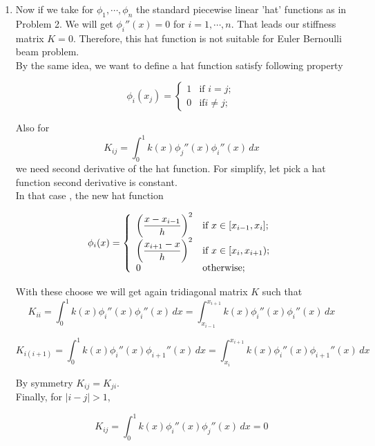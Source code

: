 {\begin{solution}
\begin{enumerate}
\item Now if we take for $\phi_1, \cdots, \phi_n$  the standard piecewise linear 'hat' functions as in Problem 2. We will get $ \phi_i''(x) = 0$ for $i=1,\cdots , n$. That leads our stiffness matrix $K=0$. Therefore, this hat function is not suitable for Euler Bernoulli beam problem.\\

By the same idea, we want to define a hat function satisfy following property

															\[
															\phi_i(x_j) = \left\{
															\begin{array}{ll}
															1 & \mbox{if }i = j;\\
															0 & \mbox{if} i\neq j;
															\end{array}\right.
															\]

Also for $$K_{ij}= \int_0^1 k(x) \phi_j''(x) \phi_i''(x) \, dx $$ we need second derivative of the hat function. For simplify, let pick a hat function second derivative is constant.\\

In that case , the  new hat function
 
																			 \[
																			\phi_i(x) = \left\{
																			\begin{array}{ll}
																			\displaystyle{\left({x-x_{i-1}\over h}\right)^2} & \mbox{if }x\in [x_{i-1}, x_i];\\
																			\displaystyle{\left({x_{i+1}-x\over h}\right)^2} & \mbox{if }x\in [x_i, x_{i+1});\\
																			0 & \mbox{otherwise};
																			\end{array}\right.
																			\]
 
With these choose we will get again tridiagonal matrix $K$ such that
\[
K_{ii}=  \int_0^1 k(x) \phi_i''(x) \phi_i''(x) \, dx=  \int_{x_{i-1}}^{x_{i+1}} k(x) \phi_i''(x) \phi_i''(x) \, dx
\] 

\[
K_{i(i+1)}=  \int_0^1 k(x) \phi_i''(x) \phi_{i+1}''(x) \, dx=  \int_{x_{i}}^{x_{i+1}} k(x) \phi_i''(x) \phi_{i+1}''(x) \, dx
\] 

By symmetry $K_{ij} = K_{ji}$. \\
Finally, for  $|i-j|>1$, 

\[
K_{ij}=  \int_0^1 k(x) \phi_i''(x) \phi_{j}''(x) \, dx = 0
\] 

\end{enumerate}
\end{solution}
}{}